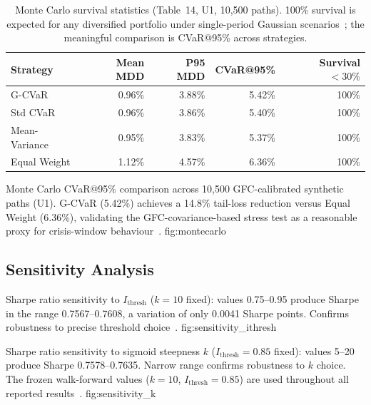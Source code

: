 \begin{table}[H]
\centering
\caption{Monte Carlo survival statistics (Table~14, U1, 10,500 paths).
         100\% survival is expected for any diversified portfolio under
         single-period Gaussian scenarios~\citep{jagannathan2003,glasserman2004};
         the meaningful comparison is CVaR@95\% across strategies.}
\label{tab:montecarlo}
\begin{tabular}{lrrrr}
\toprule
Strategy & Mean MDD & P95 MDD & CVaR@95\% & Survival $<30\%$ \\
\midrule
G-CVaR       & 0.96\% & 3.88\% & 5.42\% & 100\% \\
Std CVaR     & 0.96\% & 3.86\% & 5.40\% & 100\% \\
Mean-Variance& 0.95\% & 3.83\% & 5.37\% & 100\% \\
Equal Weight & 1.12\% & 4.57\% & 6.36\% & 100\% \\
\bottomrule
\end{tabular}
\end{table}

  {Monte Carlo CVaR@95\% comparison across 10,500 GFC-calibrated
   synthetic paths (U1). G-CVaR (5.42\%) achieves a 14.8\%
   tail-loss reduction versus Equal Weight (6.36\%), validating
   the GFC-covariance-based stress test as a reasonable proxy for
   crisis-window behaviour~\citep{glasserman2004,cont2001}.}
  {fig:montecarlo}

\subsection{Sensitivity Analysis}

  {Sharpe ratio sensitivity to $I_{\text{thresh}}$ ($k=10$ fixed):
   values 0.75--0.95 produce Sharpe in the range 0.7567--0.7608,
   a variation of only 0.0041 Sharpe points. Confirms robustness
   to precise threshold choice~\citep{kolm2014,harvey2016}.}
  {fig:sensitivity_ithresh}

  {Sharpe ratio sensitivity to sigmoid steepness $k$ ($I_{\text{thresh}}
   = 0.85$ fixed): values 5--20 produce Sharpe 0.7578--0.7635.
   Narrow range confirms robustness to $k$ choice. The frozen
   walk-forward values ($k=10$, $I_{\text{thresh}}=0.85$) are used
   throughout all reported results~\citep{white2000,harvey2016}.}
  {fig:sensitivity_k}


